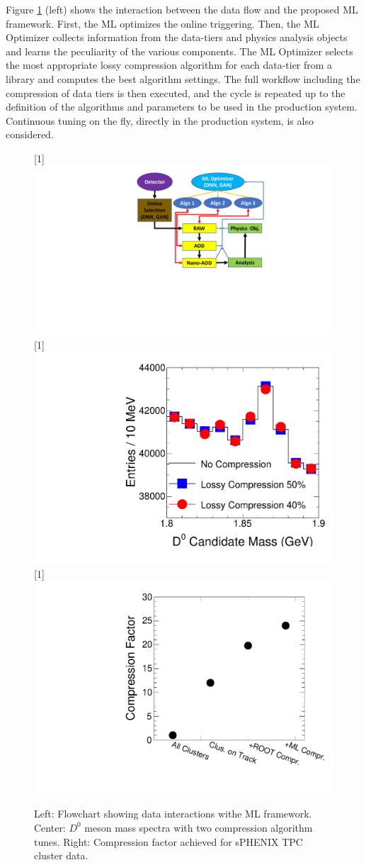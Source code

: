 Figure \ref{fig:concept} (left) shows the interaction between the data flow and the proposed ML framework. First, the ML optimizes the online triggering. Then, the ML Optimizer collects information from the data-tiers and  physics analysis objects and learns the peculiarity of the various components. The ML Optimizer selects the most appropriate lossy compression algorithm for each data-tier from a library and computes the best algorithm settings. The full workflow including the compression of data tiers is then executed, and the cycle is repeated up to the definition of the algorithms and parameters to be used in the production system. Continuous tuning on the fly, directly in the production system, is also considered.   

\begin{figure}[!ht]
    \vspace{-0.4cm}
    \begin{center}
    \scalebox{1}[1]{\includegraphics[width=.34\textwidth]{HI_Compress/figure/CompSchemaV4.pdf}}
    \hspace{0.03\textwidth}
    \scalebox{1}[1]{\includegraphics[width=.28\textwidth,keepaspectratio]{HI_Compress/figure/aleph/Performance_v6.pdf}}
     \scalebox{1}[1]{\includegraphics[width=.295\textwidth,keepaspectratio]{HI_Compress/figure/sphenix_comp_v3.pdf}}
    \vspace{-0.5cm}
    \caption{Left: Flowchart showing data interactions withe ML framework. Center: $D^0$ meson mass spectra with two compression algorithm tunes. Right: Compression factor achieved for sPHENIX TPC cluster data.}
    \label{fig:concept}
    \end{center}
\end{figure}
